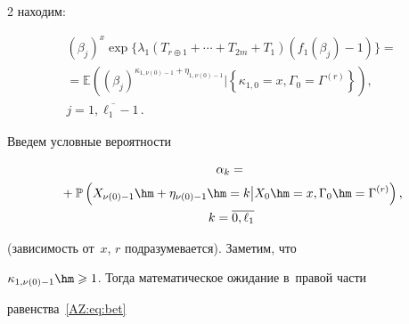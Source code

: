 \begin{multicols}{2}
находим:

\begin{multline}

  \label{AZ:eq:bet}

  (\beta_{j})^{x}\exp\{\lambda_{1}(T_{r\oplus1}+\cdots+T_{2m}+T_{1}) %

  (f_{1}(\beta_{j})-1)\}={}  \\ 

  {}=

  \mathbb{E}\left((\beta_{j})^{\kappa_{1,\nu(0)-1}+\eta_{1,\nu(0)-1}}\Big|

 \left \{\kappa_{1,0}=x,\Gamma_{0}=\Gamma^{(r)}\right\}\right),\\

  j=\overline{1,\ell_1-1}\,.

\end{multline}

Введем условные вероятности



\vspace*{-4pt}



\noindent

\begin{multline*}

\alpha_{k}={}\\

{}+\mathbb{P}\left(X_{\nu(0)-1}\hm+\eta_{\nu(0)-1}\hm=k\big\vert 

X_{0}\hm=x,\Gamma_{0}\hm=\Gamma^{(r)}\right),\\

 k=\overline{0, \ell_1}

\end{multline*}



\vspace*{-4pt}



\noindent

(зависимость от~$x$, $r$ подразумевается). Заметим, что

$\kappa_{1,\nu(0)-1}\hm\geqslant1$. Тогда математическое ожидание в~правой части

равенства~\eqref{AZ:eq:bet}



\vspace*{-4pt}



\noindent

\begin{multline*}


\end{multline*}
\end{multicols}
